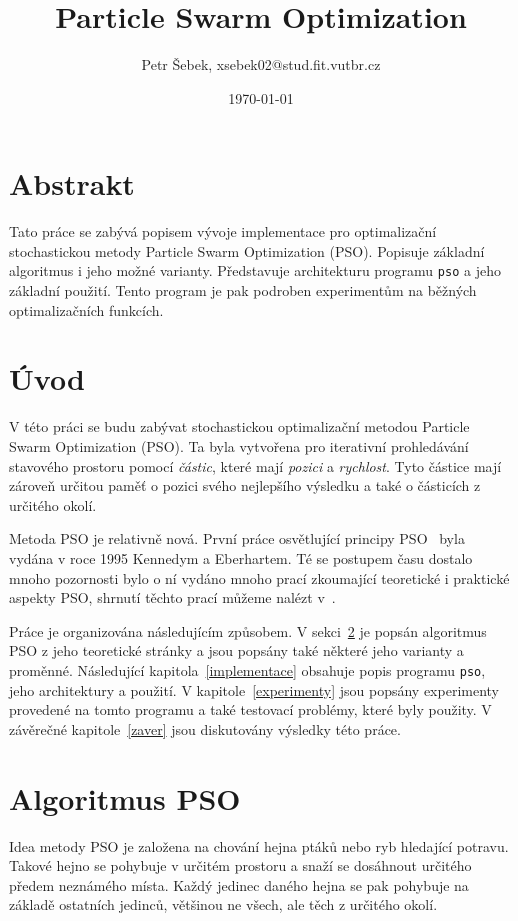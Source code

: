 \documentclass[12pt,a4paper,fleqn]{article}
\title{Particle Swarm Optimization}
\author{Petr Šebek, xsebek02@stud.fit.vutbr.cz}
\date{\today}
\begin{document}
\maketitle

\section*{Abstrakt}
\cite{neng}\cite{molga2005test}
Tato práce se zabývá popisem vývoje implementace pro optimalizační stochastickou metody Particle Swarm Optimization (PSO). Popisuje základní algoritmus i jeho možné varianty. Představuje architekturu programu \texttt{pso} a jeho základní použití. Tento program je pak podroben experimentům na běžných optimalizačních funkcích.


\section{Úvod}
V této práci se budu zabývat stochastickou optimalizační metodou Particle Swarm  Optimization (PSO). 
Ta byla vytvořena pro iterativní prohledávání stavového prostoru pomocí \textit{částic}, které mají \textit{pozici} a \textit{rychlost}. Tyto částice mají zároveň určitou paměť o pozici svého nejlepšího výsledku a také o částicích z určitého okolí.

Metoda PSO je relativně nová. První práce osvětlující principy PSO~\cite{eberhat1995particle} byla vydána v roce 1995 Kennedym a Eberhartem. Té se postupem času dostalo mnoho pozornosti bylo o ní vydáno mnoho prací zkoumající teoretické i praktické aspekty PSO, shrnutí těchto prací můžeme nalézt v~\cite{poli2007particle}.

Práce je organizována následujícím způsobem. V sekci~\ref{algoritmus_pso} je popsán algoritmus PSO z jeho teoretické stránky a jsou popsány také některé jeho varianty a proměnné. Následující kapitola~\ref{implementace} obsahuje popis programu \texttt{pso}, jeho architektury a použití. V kapitole~\ref{experimenty} jsou popsány experimenty provedené na tomto programu a také testovací problémy, které byly použity. V závěrečné kapitole~\ref{zaver} jsou diskutovány výsledky této práce.

\section{Algoritmus PSO} \label{algoritmus_pso}
Idea metody PSO je založena na chování hejna ptáků nebo ryb hledající potravu. Takové hejno se pohybuje v určitém prostoru a snaží se dosáhnout určitého předem neznámého místa. Každý jedinec daného hejna se pak pohybuje na základě ostatních jedinců, většinou ne všech, ale těch z určitého okolí.
\end{document}
